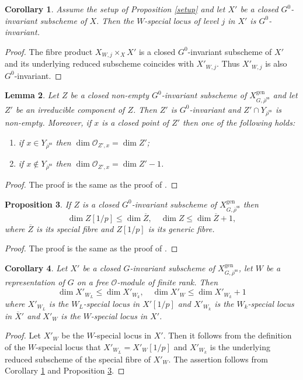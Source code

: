 \documentclass{amsart}
\newtheorem{prop}{Proposition}[section]
\newtheorem{lem}[prop]{Lemma}
\newtheorem{cor}[prop]{Corollary}
\theoremstyle{definition}
\theoremstyle{remark}
\newcommand{\Zbar}{\overline{Z}}
\newcommand{\OO}{\mathcal O}
\newcommand{\rhobar}{\overline{\rho}}
\newcommand{\gen}{\mathrm{gen}}
\newcommand{\Xbar}{\overline{X}}
\newcommand{\rhobarss}{\rhobar^{\mathrm{ss}}}
\begin{document}
\begin{cor}\label{setup_prime} Assume the setup of Proposition \ref{setup} and let $X'$ be a closed $G^0$-invariant 
subscheme of $X$. Then the $W$-special locus of level $j$ in $X'$ is $G^0$-invariant.
\end{cor}
\begin{proof} The fibre product $X_{W,j}\times_X X'$ is a closed  $G^0$-invariant subscheme of $X'$ and
its underlying reduced subscheme coincides with $X'_{W,j}$. Thus $X'_{W,j}$ is also $G^0$-invariant.
\end{proof} 

\begin{lem}\label{local_ring_dim} Let $Z$ be a closed non-empty $G^0$-invariant subscheme of $X^{\gen}_{G, \rhobarss}$ and let 
$Z'$ be an irreducible component of $Z$. Then $Z'$ is $G^0$-invariant and $Z'\cap Y_{\rhobarss}$ is non-empty. 
Moreover, if $x$ is a closed point of $Z'$ then one of the following holds:
\begin{enumerate}
\item if $x\in Y_{\rhobarss}$ then $\dim \OO_{Z', x} = \dim Z'$;
\item if $x\not\in Y_{\rhobarss}$ then $\dim \OO_{Z', x} = \dim Z'-1$.
\end{enumerate}
\end{lem} 
\begin{proof} The proof is the same as the proof of \cite[Lemma 3.21]{BIP_new}.
\end{proof}


\begin{prop}\label{dim_sp_gen} If $Z$ is a closed $G^0$-invariant subscheme of $X^{\gen}_{G, \rhobarss}$ then 
$$\dim Z[1/p]\le \dim \Zbar,\quad \dim Z\le \dim \Zbar+1,$$
where $\Zbar$ is its special fibre and  $Z[1/p]$ is its generic fibre. 
\end{prop} 
\begin{proof} The proof is the same as the proof of \cite[Lemma 3.23]{BIP_new}.
\end{proof} 

\begin{cor}\label{gen_sp_dim} Let $X'$ be a closed $G$-invariant subscheme of $X^{\gen}_{G, \rhobarss}$, let $W$ be a representation
of $G$ on a free $\OO$-module of finite rank. Then 
$$\dim X'_{W_L}\le \dim X'_{W_k}, \quad \dim X'_{W}\le \dim X'_{W_k}+1$$
where $X'_{W_L}$ is the $W_L$-special locus in $X'[1/p]$ and $X'_{W_k}$ is the $W_k$-special locus in 
$\Xbar'$ and $X'_W$ is the $W$-special locus in $X'$.
\end{cor}
\begin{proof}
Let $X'_W$ be the $W$-special locus in $X'$. Then it follows from the definition of the $W$-special locus 
that $X'_{W_L}= X'_W[1/p]$ and $X'_{W_k}$ is the underlying reduced subscheme of 
the special fibre of $X'_W$. 
The assertion follows from Corollary \ref{setup_prime} and Proposition \ref{dim_sp_gen}.
\end{proof}
\end{document}
